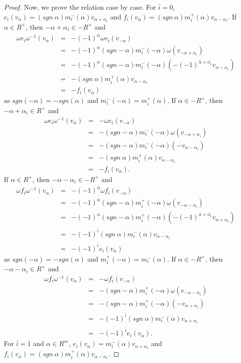 \documentclass[10pt,a4paper]{amsart}
\newcommand{\al}{\alpha}
\newcommand{\om}{\omega}
\begin{document}
\begin{proof}
		Now, we prove the relation case by case. For $\bar{i}=0$, $e_i(v_{\al})=(sgn~\al)m_i^-(\al)v_{\al+\al_i}$ and $f_i(v_{\al})=(sgn~\al)m_i^+(\al)v_{\al-\al_i}$. If $\al\in R^+$, then $-\al+\al_i\in-R^+$ and
		\begin{eqnarray*}
			\om e_i\om^{-1}(v_{\al})&=&-(-1)^{\bar{\al}}\om e_i(v_{-\al})\\&=&-(-1)^{\bar{\al}}(sgn-\al)m_i^-(-\al)\om(v_{-\al+\al_i})\\&=&-(-1)^{\bar{\al}}(sgn-\al)m_i^-(-\al)(-(-1)^{\bar{\al}+\bar{\al_i}}v_{\al-\al_i})\\&=&-(sgn~\al)m_i^+(\al)v_{\al-\al_i}\\&=&-f_i(v_{\al})
		\end{eqnarray*}
		as $sgn(-\al)=-sgn(\al)$ and $m_i^-(-\al)=m_i^+(\al)$. If $\al\in-R^+$, then $-\al+\al_i\in R^+$ and 
		\begin{eqnarray*}
			\om e_i\om^{-1}(v_{\al})&=&-\om e_i(v_{-\al})\\&=&-(sgn-\al)m_i^-(-\al)\om(v_{-\al+\al_i})\\&=&-(sgn-\al)m_i^-(-\al)(-v_{\al-\al_i})\\&=&-(sgn~\al)m_i^+(\al)v_{\al-\al_i}\\&=&-f_i(v_{\al}).
		\end{eqnarray*}
		If $\al\in R^+$, then $-\al-\al_i\in-R^+$ and
		\begin{eqnarray*}
			\om f_i\om^{-1}(v_{\al})&=&-(-1)^{\bar{\al}}\om f_i(v_{-\al})\\&=&-(-1)^{\bar{\al}}(sgn-\al)m_i^+(-\al)\om(v_{-\al-\al_i})\\&=&-(-1)^{\bar{\al}}(sgn-\al)m_i^+(-\al)(-(-1)^{\bar{\al}+\bar{\al_i}}v_{\al+\al_i})\\&=&-(-1)^{\bar{i}}(sgn~\al)m_i^-(\al)v_{\al-\al_i}\\&=&-(-1)^{\bar{i}}e_i(v_{\al})
		\end{eqnarray*}
		as $sgn(-\al)=-sgn(\al)$ and $m_i^+(-\al)=m_i^-(\al)$. If $\al\in-R^+$, then $-\al-\al_i\in R^+$ and 
		\begin{eqnarray*}
			\om f_i\om^{-1}(v_{\al})&=&-\om f_i(v_{-\al})\\&=&-(sgn-\al)m_i^+(-\al)\om(v_{-\al-\al_i})\\&=&-(sgn-\al)m_i^+(-\al)(-v_{\al+\al_i})\\&=&-(-1)^{\bar{i}}(sgn~\al)m_i^-(\al)v_{\al+\al_i}\\&=&-(-1)^{\bar{i}}e_i(v_{\al}).
		\end{eqnarray*}
		For $\bar{i}=1$ and $\al\in R^{re}$, $e_i(v_{\al})=m_i^-(\al)v_{\al+\al_i}$ and $f_i(v_{\al})=(sgn~\al)m_i^+(\al)v_{\al-\al_i}$.

\end{proof}
\end{document}
